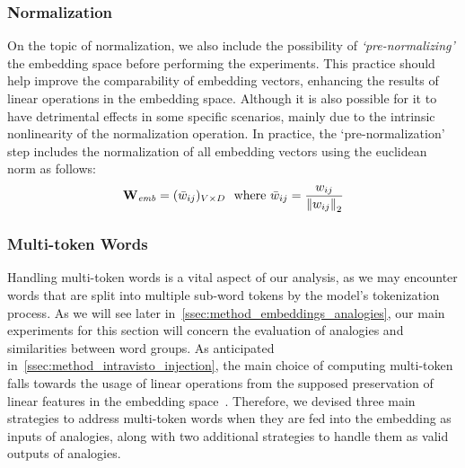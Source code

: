 \subsubsection{Normalization}

On the topic of normalization, we also include the possibility of \emph{`pre-normalizing'} the embedding space before performing the experiments.
This practice should help improve the comparability of embedding vectors, enhancing the results of linear operations in the embedding space.
Although it is also possible for it to have detrimental effects in some specific scenarios, mainly due to the intrinsic nonlinearity of the normalization operation.
In practice, the `pre-normalization' step includes the normalization of all embedding vectors using the euclidean norm as follows:
\begin{equation}
    \label{eq:method_embeddings_normalization}
    \bm{\mathbf{W}}_{\textit{emb}} = (\bar w_{ij})_{V \times D}
    \ \ \text{where}\ \bar w_{ij} = \frac{w_{ij}}{{\| w_{ij} \|}_2}
\end{equation}

\subsubsection{Multi-token Words}

Handling multi-token words is a vital aspect of our analysis, as we may encounter words that are split into multiple sub-word tokens by the model's tokenization process.
As we will see later in~\cref{ssec:method_embeddings_analogies}, our main experiments for this section will concern the evaluation of analogies and similarities between word groups.
As anticipated in~\cref{ssec:method_intravisto_injection}, the main choice of computing multi-token falls towards the usage of linear operations from the supposed preservation of linear features in the embedding space~\cite{mikolov2013,park2023}.
Therefore, we devised three main strategies to address multi-token words when they are fed into the embedding as inputs of analogies, along with two additional strategies to handle them as valid outputs of analogies.

